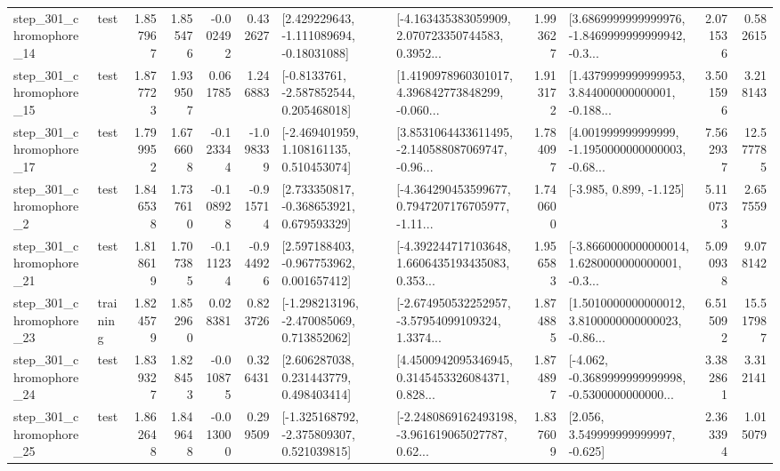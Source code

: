 \begin{tabular}{llrrrrllrlrr}
  step\_301\_chromophore\_14 &      test &      1.857967 &    1.855476 &     -0.002492 &  0.432627 &    [2.429229643, -1.111089694, -0.18031088] &  [-4.163435383059909, 2.070723350744583, 0.3952... &       1.993627 &  [3.6869999999999976, -1.8469999999999942, -0.3... &            2.071536 &          0.582615 \\
  step\_301\_chromophore\_15 &      test &      1.877723 &    1.939507 &      0.061785 &  1.246883 &     [-0.8133761, -2.587852544, 0.205468018] &  [1.4190978960301017, 4.396842773848299, -0.060... &       1.913172 &  [1.4379999999999953, 3.844000000000001, -0.188... &            3.501596 &          3.218143 \\
  step\_301\_chromophore\_17 &      test &      1.799952 &    1.676608 &     -0.123344 & -1.098339 &    [-2.469401959, 1.108161135, 0.510453074] &  [3.8531064433611495, -2.140588087069747, -0.96... &       1.784097 &  [4.001999999999999, -1.1950000000000003, -0.68... &            7.562937 &         12.577785 \\
   step\_301\_chromophore\_2 &      test &      1.846538 &    1.737610 &     -0.108928 & -0.915714 &    [2.733350817, -0.368653921, 0.679593329] &  [-4.364290453599677, 0.7947207176705977, -1.11... &       1.740600 &                            [-3.985, 0.899, -1.125] &            5.110733 &          2.657559 \\
  step\_301\_chromophore\_21 &      test &      1.818619 &    1.707385 &     -0.111234 & -0.944926 &    [2.597188403, -0.967753962, 0.001657412] &  [-4.392244717103648, 1.6606435193435083, 0.353... &       1.956583 &  [-3.8660000000000014, 1.6280000000000001, -0.3... &            5.090938 &          9.078142 \\
  step\_301\_chromophore\_23 &  training &      1.824579 &    1.852960 &      0.028381 &  0.823726 &   [-1.298213196, -2.470085069, 0.713852062] &  [-2.674950532252957, -3.57954099109324, 1.3374... &       1.874885 &  [1.5010000000000012, 3.8100000000000023, -0.86... &            6.515092 &         15.517987 \\
  step\_301\_chromophore\_24 &      test &      1.839327 &    1.828453 &     -0.010875 &  0.326431 &     [2.606287038, 0.231443779, 0.498403414] &  [4.4500942095346945, 0.3145453326084371, 0.828... &       1.874897 &  [-4.062, -0.3689999999999998, -0.5300000000000... &            3.382861 &          3.312141 \\
  step\_301\_chromophore\_25 &      test &      1.862648 &    1.849648 &     -0.013000 &  0.299509 &   [-1.325168792, -2.375809307, 0.521039815] &  [-2.2480869162493198, -3.961619065027787, 0.62... &       1.837609 &                 [2.056, 3.549999999999997, -0.625] &            2.363394 &          1.015079 \\

\end{tabular}
